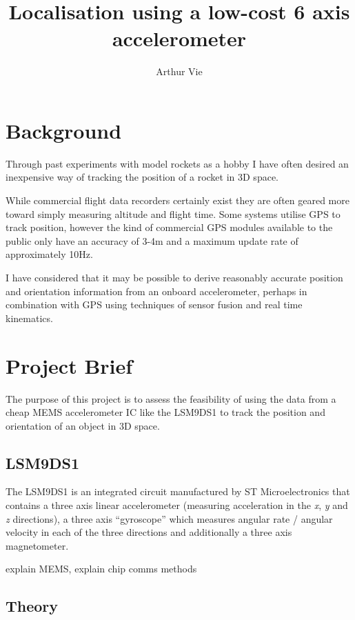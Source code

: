 \documentclass[10pt, a4paper]{article}
\author{Arthur Vie}
\title{Localisation using a low-cost 6 axis accelerometer}
\def\vs{\vspace{6pt}}
\begin{document}
\maketitle

\section{Background}

Through past experiments with model rockets as a hobby I have often desired an inexpensive way of tracking the position of a rocket in 3D space. 

\vs
While commercial flight data recorders certainly exist they are often geared more toward simply measuring altitude and flight time. Some systems utilise GPS to track position, however the kind of commercial GPS modules available to the public only have an accuracy of 3-4m and a maximum update rate of approximately 10Hz.

\vs
I have considered that it may be possible to derive reasonably accurate position and orientation information from an onboard accelerometer, perhaps in combination with GPS using techniques of sensor fusion and real time kinematics.


\section{Project Brief}

The purpose of this project is to assess the feasibility of using the data from a cheap MEMS accelerometer IC like the LSM9DS1 to track the position and orientation of an object in 3D space.
\vs

\subsection{LSM9DS1}

The LSM9DS1 is an integrated circuit manufactured by ST Microelectronics that contains a three axis linear accelerometer (measuring acceleration in the \textit{x}, \textit{y} and \textit{z} directions), a three axis ``gyroscope'' which measures angular rate / angular velocity in each of the three directions and additionally a three axis magnetometer.
\vs

explain MEMS, explain chip comms methods


\subsection{Theory}
\end{document}
